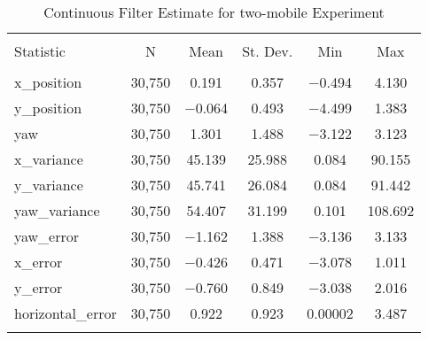 
\begin{table}[h] \centering 
  \caption{Continuous Filter Estimate for two-mobile Experiment} 
  \label{tab:two_mobile_continuous_summary} 
\begin{tabular}{@{\extracolsep{5pt}}lccccc} 
\\[-1.8ex]\hline 
\hline \\[-1.8ex] 
Statistic & \multicolumn{1}{c}{N} & \multicolumn{1}{c}{Mean} & \multicolumn{1}{c}{St. Dev.} & \multicolumn{1}{c}{Min} & \multicolumn{1}{c}{Max} \\ 
\hline \\[-1.8ex] 
x\_position & 30,750 & \num{0.191} & \num{0.357} & $-$0.494 & \num{4.130} \\ 
y\_position & 30,750 & $-$0.064 & \num{0.493} & $-$4.499 & \num{1.383} \\ 
yaw & 30,750 & \num{1.301} & \num{1.488} & $-$3.122 & \num{3.123} \\ 
x\_variance & 30,750 & \num{45.139} & \num{25.988} & \num{0.084} & \num{90.155} \\ 
y\_variance & 30,750 & \num{45.741} & \num{26.084} & \num{0.084} & \num{91.442} \\ 
yaw\_variance & 30,750 & \num{54.407} & \num{31.199} & \num{0.101} & \num{108.692} \\ 
yaw\_error & 30,750 & $-$1.162 & \num{1.388} & $-$3.136 & \num{3.133} \\ 
x\_error & 30,750 & $-$0.426 & \num{0.471} & $-$3.078 & \num{1.011} \\ 
y\_error & 30,750 & $-$0.760 & \num{0.849} & $-$3.038 & \num{2.016} \\ 
horizontal\_error & 30,750 & \num{0.922} & \num{0.923} & \num{0.00002} & \num{3.487} \\ 
\hline \\[-1.8ex] 
\end{tabular} 
\end{table} 
